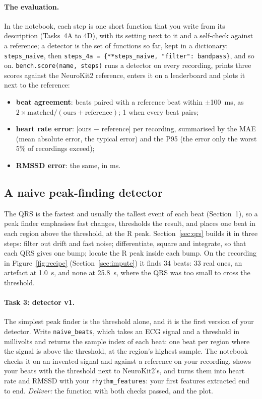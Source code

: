 \documentclass[12pt,article,oneside,linkcolour=blue]{oxengthesis}
\newcommand{\nb}[1]{\noindent{\small\textsf{Notebook: #1}}\par\nopagebreak\smallskip}
\begin{document}
\paragraph{The evaluation.} In the notebook, each step is one short function that you write from
its description (Tasks~4A to 4D), with its setting next to it and a self-check against a
reference; a detector is the set of functions so far, kept in a dictionary:
\texttt{steps\_naive}, then \texttt{steps\_4a = \{**steps\_naive, "filter": bandpass\}}, and
so on. \texttt{bench.score(name, steps)} runs a detector on every recording, prints three
scores against the NeuroKit2 reference, enters it on a leaderboard and plots it next to the reference:
\begin{itemize}
  \item \textbf{beat agreement}: beats paired with a reference beat within
        $\pm$\SI{100}{\milli\second}, as $2 \times \text{matched} / (\text{ours} + \text{reference})$;
        1 when every beat pairs;
  \item \textbf{heart rate error}: $|$ours $-$ reference$|$ per recording, summarised by the MAE
        (mean absolute error, the typical error) and the P95 (the error only the worst 5\% of
        recordings exceed);
  \item \textbf{RMSSD error}: the same, in ms.
\end{itemize}

\subsection{A naive peak-finding detector}
\label{sec:naive}
\nb{3.2, Task 3}

The QRS is the fastest and usually the tallest event of
each beat (Section~1), so a peak finder emphasises fast changes, thresholds the result, and
places one beat in each region above the threshold, at the R peak. Section~\ref{sec:qrs} builds it in
three steps: filter out drift and fast noise; differentiate, square
and integrate, so that each QRS gives one bump; locate the R peak inside each bump. On the
recording in Figure~\ref{fig:recipe} (Section~\ref{sec:impute}) it finds 34 beats: 33 real ones, an artefact at
\SI{1.0}{\second}, and none at \SI{25.8}{\second}, where the QRS was too small to cross the
threshold.

\paragraph{Task 3: detector v1.} The simplest peak finder is the threshold alone,
and it is the first version of your detector. Write
\texttt{naive\_beats}, which takes an ECG signal and a threshold in millivolts and returns the
sample index of each beat: one beat per region where the signal is above the threshold, at the
region's highest sample. The notebook checks it on an invented signal and against a reference on
your recording, shows your beats with the threshold next to NeuroKit2's, and turns them into
heart rate and RMSSD with your \texttt{rhythm\_features}: your first features extracted end to
end. \emph{Deliver:} the function with both checks passed, and the plot.
\end{document}
